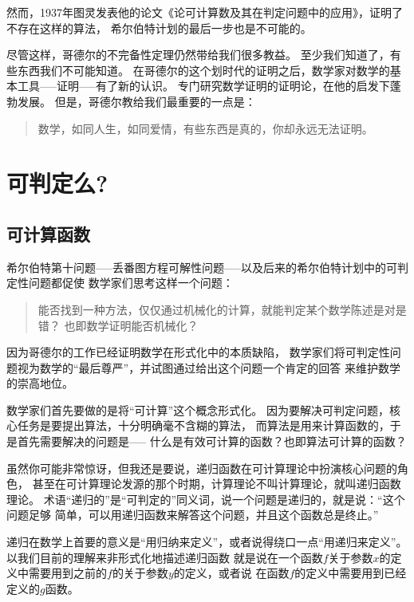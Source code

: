 \documentclass[12pt,a4paper,oneside]{ctexrep}
\theoremstyle{definition}
\begin{document}
然而，1937年图灵发表他的论文《论可计算数及其在判定问题中的应用》，证明了不存在这样的算法，
希尔伯特计划的最后一步也是不可能的。

尽管这样，哥德尔的不完备性定理仍然带给我们很多教益。
至少我们知道了，有些东西我们不可能知道。
在哥德尔的这个划时代的证明之后，数学家对数学的基本工具-----证明-----有了新的认识。
专门研究数学证明的证明论，在他的启发下蓬勃发展。
但是，哥德尔教给我们最重要的一点是\cite{dream}：

\begin{quote}
数学，如同人生，如同爱情，有些东西是真的，你却永远无法证明。
\end{quote}

\section{可判定么?}

\subsection{可计算函数}

希尔伯特第十问题-----丢番图方程可解性问题-----以及后来的希尔伯特计划中的可判定性问题都促使
数学家们思考这样一个问题：

\begin{quote}
能否找到一种方法，仅仅通过机械化的计算，就能判定某个数学陈述是对是错？
也即数学证明能否机械化？
\end{quote}

因为哥德尔的工作已经证明数学在形式化中的本质缺陷，
数学家们将可判定性问题视为数学的“最后尊严”，并试图通过给出这个问题一个肯定的回答
来维护数学的崇高地位。

数学家们首先要做的是将“可计算”这个概念形式化。
因为要解决可判定问题，核心任务是要提出算法，十分明确毫不含糊的算法，
而算法是用来计算函数的，于是首先需要解决的问题是-----
什么是有效可计算的函数？也即算法可计算的函数？

虽然你可能非常惊讶，但我还是要说，递归函数在可计算理论中扮演核心问题的角色，
甚至在可计算理论发源的那个时期，计算理论不叫计算理论，就叫递归函数理论。
术语“递归的”是“可判定的”同义词，说一个问题是递归的，就是说：“这个问题足够
简单，可以用递归函数来解答这个问题，并且这个函数总是终止。”

递归在数学上首要的意义是“用归纳来定义”，或者说得绕口一点“用递归来定义”。
以我们目前的理解来非形式化地描述递归函数
就是说在一个函数$f$关于参数$x$的定义中需要用到之前的$f$的关于参数$y$的定义，或者说
在函数$f$的定义中需要用到已经定义的$g$函数。
\end{document}
